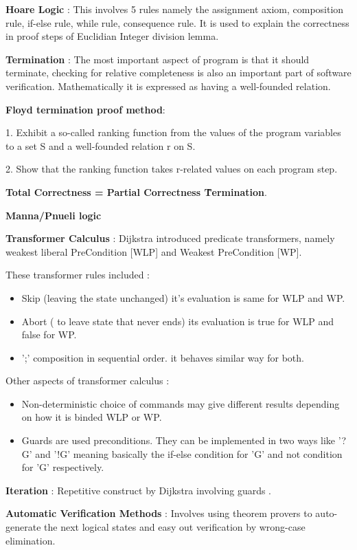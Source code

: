 \begin{itemize}
	\item{\textbf{Hoare Logic} : This involves 5 rules namely the assignment axiom, composition rule, if-else rule, while rule, consequence rule. It is used to explain the correctness in proof steps of Euclidian Integer division lemma.}

	\item{\textbf{Termination} : The most important aspect of program is that it should terminate, checking for relative completeness is also an important part of software verification. Mathematically it is expressed as having a well-founded relation.}

	\item{\textbf{Floyd termination proof method}:

	1. Exhibit a so-called ranking function from the values of the program variables to a set S and a well-founded relation r on S. 
 
	2. Show that the ranking function takes r-related values on each program step.
	}

	\item{\textbf{Total Correctness  =  Partial Correctness \^ Termination}.}

	\item{\textbf{Manna/Pnueli logic}}

	\item{\textbf{Transformer Calculus} : 
	Dijkstra introduced predicate transformers, namely weakest liberal PreCondition [WLP] and Weakest PreCondition [WP].  

	These transformer rules included : 
	\begin{itemize}
		\item{ Skip (leaving the state unchanged) it's evaluation is same for WLP and WP.}
		\item{ Abort ( to leave state that never ends) its evaluation is true for WLP and false for WP.}
		\item{';' composition in sequential order. it behaves similar way for both.}
	\end{itemize}

	Other aspects of transformer calculus :
	\begin{itemize}
		\item{ Non-deterministic choice of commands may give different results depending on how it is binded WLP or WP.}
		\item{ Guards are used preconditions. They can be implemented in two ways like '?G' and '!G' meaning basically the if-else condition for 'G' and not condition for 'G' respectively. }
	\end{itemize}

	\item{\textbf{Iteration} : Repetitive construct by Dijkstra involving guards .}

	}
	\item{\textbf{Automatic Verification Methods} : Involves using theorem provers to auto-generate the next logical states and easy out verification by wrong-case elimination.
	}
	
\end{itemize}



